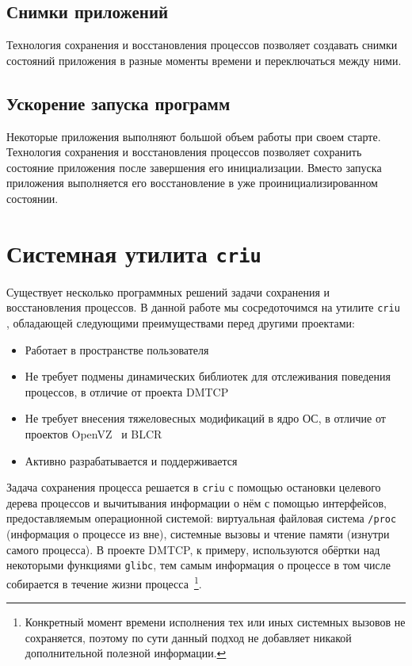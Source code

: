\subsection{Снимки приложений}
 
Технология сохранения и восстановления процессов позволяет создавать снимки состояний приложения в разные моменты времени и переключаться между ними. 
 
\subsection{Ускорение запуска программ}
 
Некоторые приложения выполняют большой объем работы при своем старте. Технология сохранения и восстановления процессов позволяет сохранить состояние приложения после завершения его инициализации. Вместо запуска приложения выполняется его восстановление в уже проинициализированном состоянии.

\section{Системная утилита \texttt{criu}}

Существует несколько программных решений задачи сохранения и восстановления процессов. В данной работе мы сосредоточимся на утилите \texttt{criu} \cite{url:criu}, обладающей следующими преимуществами перед другими проектами:

\begin{itemize}
    \item Работает в пространстве пользователя
    \item Не требует подмены динамических библиотек для отслеживания поведения процессов, в отличие от проекта DMTCP \cite{url:dmtcp}
    \item Не требует внесения тяжеловесных модификаций в ядро ОС, в отличие от проектов OpenVZ~\cite{url:openvz} и BLCR~\cite{url:blcr}
    \item Активно разрабатывается и поддерживается
\end{itemize}

Задача сохранения процесса решается в \texttt{criu} с помощью остановки целевого дерева процессов и вычитывания информации о нём с помощью интерфейсов, предоставляемым операционной системой: виртуальная файловая система \texttt{/proc} (информация о процессе из вне), системные вызовы и чтение памяти (изнутри самого процесса). В проекте DMTCP, к примеру, используются обёртки над некоторыми функциями \texttt{glibc}, тем самым информация о процессе в том числе собирается в течение жизни процесса~\footnote{Конкретный момент времени исполнения тех или иных системных вызовов не сохраняется, поэтому по сути данный подход не добавляет никакой дополнительной полезной информации.}.

